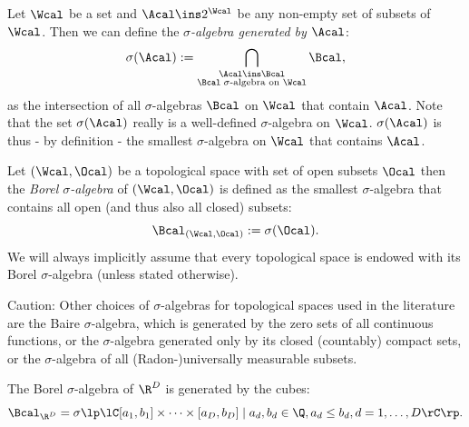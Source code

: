 \begin{Def}
    \label{def-sigma-algebra-gen}
    Let $\Wcal$ be a set and $\Acal \ins 2^\Wcal$ be any non-empty set of subsets of $\Wcal$.
    Then we can define the \emph{$\sigma$-algebra generated by $\Acal$}:
    \[ \sigma(\Acal) := \bigcap_{\substack{ \Acal \ins \Bcal \\\Bcal\; \sigma\text{-algebra on }\Wcal }} \Bcal, \]
    as the intersection of all $\sigma$-algebras $\Bcal$ on $\Wcal$ that contain $\Acal$. 
    Note that the set $\sigma(\Acal)$ really is a well-defined $\sigma$-algebra on $\Wcal$. %
    $\sigma(\Acal)$ is thus - by definition - the smallest $\sigma$-algebra on $\Wcal$ that contains $\Acal$.
\end{Def}


\begin{Def}
    Let $(\Wcal,\Ocal)$ be a topological space with set of open subsets $\Ocal$ then the \emph{Borel $\sigma$-algebra} of $(\Wcal,\Ocal)$ is 
    defined as the smallest $\sigma$-algebra that contains all open (and thus also all closed) subsets:
    \[ \Bcal_{(\Wcal,\Ocal)} := \sigma(\Ocal).\]
    We will always implicitly assume that every topological space is endowed with its Borel $\sigma$-algebra (unless stated otherwise).
\end{Def}

\begin{Rem}
    Caution: Other choices of $\sigma$-algebras for topological spaces used in the literature are the Baire $\sigma$-algebra, which is generated by the zero sets of all continuous functions, or the $\sigma$-algebra generated only by its closed (countably) compact sets, or the $\sigma$-algebra of all (Radon-)universally measurable subsets.
\end{Rem}

\begin{Lem}[Borel $\sigma$-algebra on $\R^D$]    
    The Borel $\sigma$-algebra of $\R^D$ is generated by the cubes:
\[ \Bcal_{\R^D} = \sigma\lp\lC [a_1,b_1] \times \cdots \times [a_D,b_D]\;|\; a_d, b_d \in \Q, a_d \le b_d, d=1,\dots,D    \rC\rp.  \]
\end{Lem}


